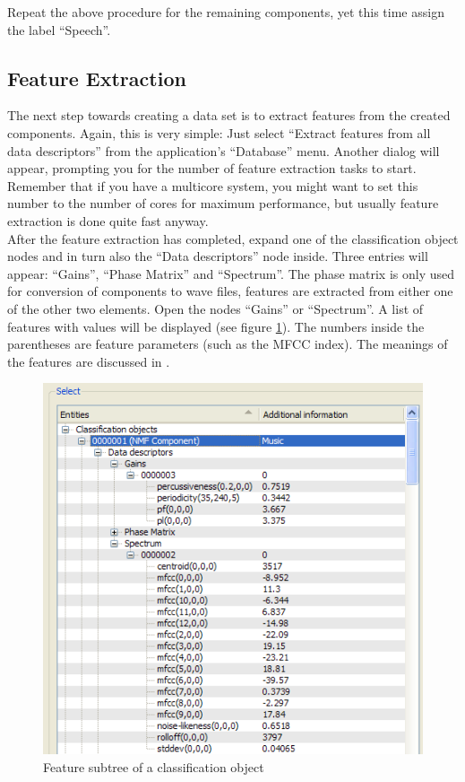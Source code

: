 Repeat the above procedure for the remaining components, yet this time assign
the label ``Speech''.


\subsection{Feature Extraction}

The next step towards creating a data set is to extract features from the
created components. Again, this is very simple: Just select ``Extract features
from all data descriptors'' from the application's ``Database'' menu. Another
dialog will appear, prompting you for the number of feature extraction tasks to
start.  Remember that if you have a multicore system, you might want to set this
number to the number of cores for maximum performance, but usually feature
extraction is done quite fast anyway.\\

After the feature extraction has completed, expand one of the classification
object nodes and in turn also the ``Data descriptors'' node inside. Three
entries will appear: ``Gains'', ``Phase Matrix'' and ``Spectrum''. The phase
matrix is only used for conversion of components to wave files, features are
extracted from either one of the other two elements. Open the nodes ``Gains'' or
``Spectrum''. A list of features with values will be displayed (see figure
\ref{figure:TutorialFeatureSubtree}). The numbers inside the parentheses are
feature parameters (such as the MFCC index). The meanings of the features are
discussed in \cite{Schuller2009}.

\begin{figure}
    \centering
    \includegraphics[width=.8\textwidth]{tutorial-media/FeatureSubtree.png}
    \caption{%
        \label{figure:TutorialFeatureSubtree}%
        Feature subtree of a classification object
    }
\end{figure}


